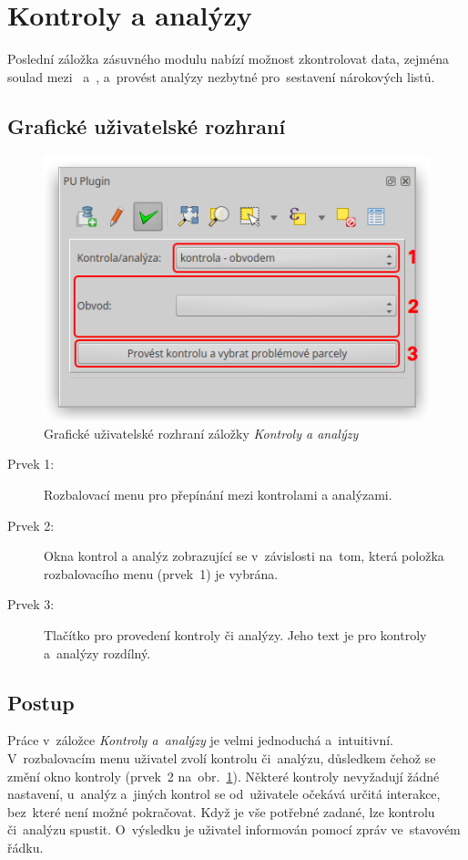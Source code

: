 \newpage

\section{Kontroly a analýzy}
\label{kontroly_analyzy}

Poslední záložka zásuvného modulu nabízí možnost zkontrolovat data, zejména soulad mezi~ a~, a~provést analýzy nezbytné pro~sestavení nárokových listů.

\subsection{Grafické uživatelské rozhraní}
\label{ca_gui}

	\begin{figure}[H]
		\centering
		\includegraphics[width=.55\textwidth]{./pictures/ca_gui.png}
		\caption[Grafické uživatelské rozhraní záložky \textit{Kontroly a analýzy}]{Grafické uživatelské rozhraní záložky \textit{Kontroly a analýzy}}
		\label{fig:ca_gui}
 	\end{figure}

\begin{description}
	\item[Prvek 1:] Rozbalovací menu pro přepínání mezi kontrolami a analýzami.
	\item[Prvek 2:] Okna kontrol a analýz zobrazující se v~závislosti na~tom, která položka rozbalovacího menu (prvek~1) je vybrána.
	\item[Prvek 3:] Tlačítko pro provedení kontroly či analýzy. Jeho text je pro kontroly a~analýzy rozdílný.
\end{description}

\subsection{Postup}
\label{postup_ca}

Práce v~záložce \textit{Kontroly a~analýzy} je velmi jednoduchá a~intuitivní. V~rozbalovacím menu uživatel zvolí kontrolu či~analýzu, důsledkem čehož se změní okno kontroly (prvek~2 na~obr.~\ref{fig:ca_gui}). Některé kontroly nevyžadují žádné nastavení, u~analýz a~jiných kontrol se od~uživatele očekává určitá interakce, bez~které není možné pokračovat. Když je vše potřebné zadané, lze kontrolu či~analýzu spustit. O~výsledku je uživatel informován pomocí zpráv ve~stavovém řádku.

